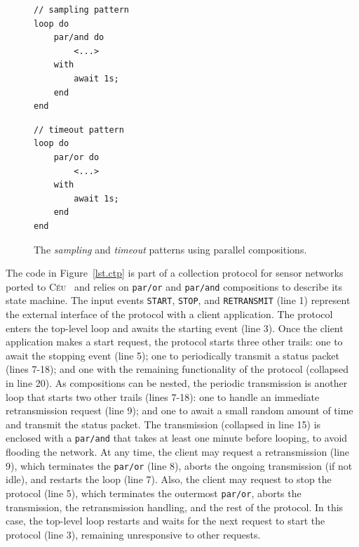 \documentclass{acm_proc_article-sp}
\newcommand{\CEU}{\textsc{C\'{e}u}\xspace}
\newcommand{\code}[1] {{\small{\texttt{#1}}}}
\newcommand{\1}{\;}
\newcommand{\2}{\;\;}
\newcommand{\3}{\;\;\;}
\newcommand{\5}{\;\;\;\;\;}
\begin{document}
\begin{figure}[t]
\begin{minipage}[t]{0.40\linewidth}
\begin{lstlisting}
// sampling pattern
loop do
    par/and do
        <...>
    with
        await 1s;
    end
end
\end{lstlisting}
\end{minipage}
%
\begin{minipage}[t]{0.40\linewidth}
\begin{lstlisting}
// timeout pattern
loop do
    par/or do
        <...>
    with
        await 1s;
    end
end
\end{lstlisting}
\end{minipage}
\caption{ The \emph{sampling} and \emph{timeout} patterns using parallel 
compositions.
\label{lst.patts}
}
\end{figure}

The code in Figure~\ref{lst.ctp} is part of a collection protocol for sensor 
networks ported to \CEU~\cite{wsn.ctp,ceu.sensys13} and relies on \code{par/or} 
and \code{par/and} compositions to describe its state machine.
%
The input events \code{START}, \code{STOP}, and \code{RETRANSMIT} (line 1) 
represent the external interface of the protocol with a client application.
%
The protocol enters the top-level loop and awaits the starting event (line 3).
Once the client application makes a start request, the protocol starts three 
other trails:
one to await the stopping event (line 5);
one to periodically transmit a status packet (lines 7-18);
and one with the remaining functionality of the protocol (collapsed in line 
20).
%
As compositions can be nested, the periodic transmission is another loop that 
starts two other trails (lines 7-18):
one to handle an immediate retransmission request (line 9);
and one to await a small random amount of time and transmit the status packet.
%
The transmission (collapsed in line 15) is enclosed with a \code{par/and} that 
takes at least one minute before looping, to avoid flooding the network.
%
At any time, the client may request a retransmission (line 9), which terminates 
the \code{par/or} (line 8), aborts the ongoing transmission (if not idle), and 
restarts the loop (line 7).
%
Also, the client may request to stop the protocol (line 5), which terminates 
the outermost \code{par/or}, aborts the transmission, the retransmission 
handling, and the rest of the protocol.
In this case, the top-level loop restarts and waits for the next request to 
start the protocol (line 3), remaining unresponsive to other requests.
\end{document}

